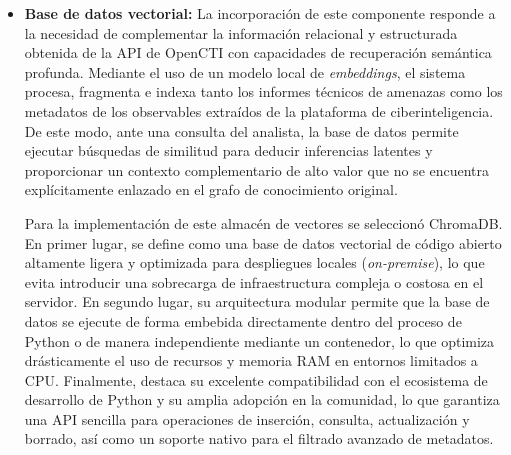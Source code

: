 \documentclass[12pt]{report}
\begin{document}
\begin{itemize}
    El flujo de procesamiento de la información se inicia cuando el analista realiza una consulta en la interfaz gráfica que menciona un IoC, momento en el cual la solicitud es interceptada de manera inmediata por el servidor de \textit{middleware Pipelines}. En lugar de transmitir la petición de forma directa al motor de inferencia local, el \textit{pipeline} extrae la petición y desvía la solicitud hacia un \textit{endpoint} específico del \textit{backend}. Al recibir este paquete, el \textit{backend} analiza la petición y llama a las funciones del motor de RAG, el cual recupera contexto técnico sobre el indicador consultando de manera estructurada tanto la API de OpenCTI como la base de datos vectorial local (ChromaDB). Una vez obtenido este contexto histórico y relacional, se devuelve en forma de respuesta al \textit{pipeline}, encargado de reformular el \textit{prompt} del usuario inyectando la información recuperada y de transmitir la instrucción final enriquecida al modelo correspondiente para que este realice su razonamiento.

    Para la construcción del \textit{backend} de servicios se seleccionó el marco de trabajo FastAPI. Esta elección se fundamenta principalmente en su sencillez y en que permite un desarrollo de \textit{endpoints} de manera rápida y eficiente, facilitando un acoplamiento ágil con el resto de componentes escritos en Python. Asimismo, FastAPI destaca por su capacidad para gestionar de manera óptima la asincronía de forma nativa.
    
    \item \textbf{Base de datos vectorial:} La incorporación de este componente responde a la necesidad de complementar la información relacional y estructurada obtenida de la API de OpenCTI con capacidades de recuperación semántica profunda. Mediante el uso de un modelo local de \textit{embeddings}, el sistema procesa, fragmenta e indexa tanto los informes técnicos de amenazas como los metadatos de los observables extraídos de la plataforma de ciberinteligencia. De este modo, ante una consulta del analista, la base de datos permite ejecutar búsquedas de similitud para deducir inferencias latentes y proporcionar un contexto complementario de alto valor que no se encuentra explícitamente enlazado en el grafo de conocimiento original.

    Para la implementación de este almacén de vectores se seleccionó ChromaDB. En primer lugar, se define como una base de datos vectorial de código abierto altamente ligera y optimizada para despliegues locales (\textit{on-premise}), lo que evita introducir una sobrecarga de infraestructura compleja o costosa en el servidor. En segundo lugar, su arquitectura modular permite que la base de datos se ejecute de forma embebida directamente dentro del proceso de Python o de manera independiente mediante un contenedor, lo que optimiza drásticamente el uso de recursos y memoria RAM en entornos limitados a CPU. Finalmente, destaca su excelente compatibilidad con el ecosistema de desarrollo de Python y su amplia adopción en la comunidad, lo que garantiza una API sencilla para operaciones de inserción, consulta, actualización y borrado, así como un soporte nativo para el filtrado avanzado de metadatos.
    

\end{itemize}
\end{document}
